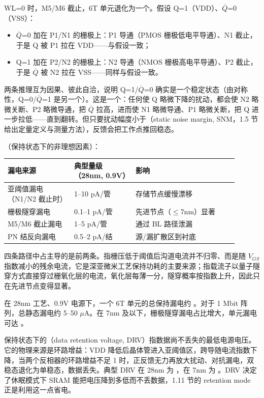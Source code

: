 WL=0 时，M5/M6 截止，6T 单元退化为一个。假设 Q=1（VDD）、$\overline{Q}$=0（VSS）：

\begin{itemize}
  \item $\overline{Q}$=0 加在 P1/N1 的栅极上：P1 导通（PMOS 栅极低电平导通）、N1 截止，于是 Q 被 P1 拉在 VDD——与假设一致；
  \item Q=1 加在 P2/N2 的栅极上：N2 导通（NMOS 栅极高电平导通）、P2 截止，于是 $\overline{Q}$ 被 N2 拉在 VSS——同样与假设一致。
\end{itemize}

两条推理互为因果、彼此自洽，说明 Q=1/$\overline{Q}$=0 确实是一个稳定状态（由对称性，Q=0/$\overline{Q}$=1 是另一个）。这是一个：任何使 Q 略微下降的扰动，都会使 N2 略微关断、P2 略微导通，把 $\overline{Q}$ 拉高，进而使 N1 略微导通、P1 略微关断，把 Q 进一步拉低——直到翻转。但只要扰动幅度小于（static noise margin, SNM，1.5 节给出定量定义与测量方法），反馈会把工作点推回稳态。

（保持状态下的非理想因素）：

\begin{longtable}{L{0.26\linewidth}L{0.24\linewidth}L{0.40\linewidth}}
\toprule
漏电来源 & 典型量级（28nm, 0.9V） & 影响 \\
\midrule
亚阈值漏电（N1/N2 截止时） & 1--10 pA/管 & 存储节点缓慢漂移 \\\tablerowrule
栅极隧穿漏电 & 0.1--1 pA/管 & 先进节点（$\leq$7nm）显著 \\\tablerowrule
M5/M6 截止漏电 & 1--5 pA/管 & 通过 BL 路径泄漏 \\\tablerowrule
PN 结反向漏电 & 0.5--2 pA/结 & 源/漏扩散区到衬底 \\
\bottomrule
\end{longtable}

四条路径中占主导的是前两条。指栅压低于阈值后沟道电流并不归零、而是随 $V_{GS}$ 指数减小的残余电流，它是深亚微米工艺保持功耗的主要来源；指载流子以量子隧穿方式直接穿过栅氧化层的电流，氧化层每薄一分，隧穿概率按指数上升，因此只在先进节点变得显著。

在 28nm 工艺、0.9V 电源下，一个 6T 单元的总保持漏电约 。对于 1 Mbit 阵列，总静态漏电约 5--50 $\mu$A。在 7nm 及以下，栅极隧穿漏电占比增大，单元漏电可达 。

保持状态下的（data retention voltage, DRV）指数据尚不丢失的最低电源电压。它的物理来源是环路增益：VDD 降低后晶体管进入亚阈值区，跨导随电流指数下降，当两个反相器的环路增益不足 1 时，正反馈无力再放大扰动、对抗漏电，双稳态退化为单稳态，数据丢失。典型 DRV 在 28nm 为 ，在 7nm 为 。DRV 决定了休眠模式下 SRAM 能把电压降到多低而不丢数据，1.11 节的 retention mode 正是利用这一点省电。

